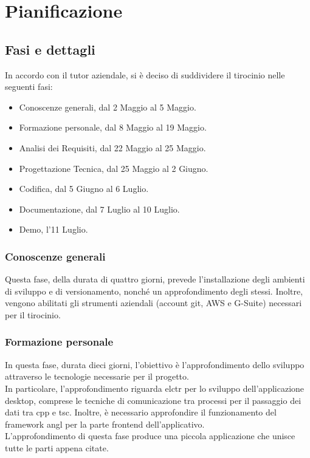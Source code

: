 \section{Pianificazione}

\subsection{Fasi e dettagli}

In accordo con il tutor aziendale, si è deciso di suddividere il tirocinio nelle seguenti fasi:
\begin{itemize}
    \item Conoscenze generali, dal 2 Maggio al 5 Maggio.
    \item Formazione personale, dal 8 Maggio al 19 Maggio.
    \item Analisi dei Requisiti, dal 22 Maggio al 25 Maggio.
    \item Progettazione Tecnica, dal 25 Maggio al 2 Giugno.
    \item Codifica, dal 5 Giugno al 6 Luglio.
    \item Documentazione, dal 7 Luglio al 10 Luglio.
    \item Demo, l'11 Luglio.
\end{itemize}

\subsubsection{Conoscenze generali}
Questa fase, della durata di quattro giorni, prevede l'installazione degli ambienti di sviluppo e di versionamento, nonché un approfondimento degli stessi. Inoltre, vengono abilitati gli strumenti aziendali (account git, AWS e G-Suite) necessari per il tirocinio.
\subsubsection{Formazione personale}
In questa fase, durata dieci giorni, l'obiettivo è l'approfondimento dello sviluppo attraverso le tecnologie necessarie per il progetto.\\
In particolare, l'approfondimento riguarda \gls{elctr} per lo sviluppo dell'applicazione desktop, comprese le tecniche di comunicazione tra processi per il passaggio dei dati tra \gls{cpp} e \gls{tsc}. Inoltre, è necessario approfondire il funzionamento del framework \gls{angl} per la parte frontend dell'applicativo.\\
L'approfondimento di questa fase produce una piccola applicazione che unisce tutte le parti appena citate.
